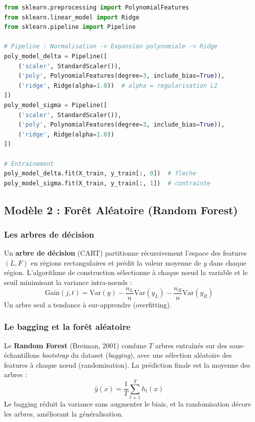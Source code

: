 \documentclass[journal, a4paper, twocolumn]{IEEEtran}
\begin{document}
\begin{lstlisting}[language=Python, caption=Pipeline Régression Polynomiale Ridge avec scikit-learn]
from sklearn.preprocessing import PolynomialFeatures
from sklearn.linear_model import Ridge
from sklearn.pipeline import Pipeline

# Pipeline : Normalisation -> Expansion polynomiale -> Ridge
poly_model_delta = Pipeline([
    ('scaler', StandardScaler()),
    ('poly', PolynomialFeatures(degree=3, include_bias=True)),
    ('ridge', Ridge(alpha=1.0))  # alpha = regularisation L2
])
poly_model_sigma = Pipeline([
    ('scaler', StandardScaler()),
    ('poly', PolynomialFeatures(degree=3, include_bias=True)),
    ('ridge', Ridge(alpha=1.0))
])

# Entrainement
poly_model_delta.fit(X_train, y_train[:, 0])  # fleche
poly_model_sigma.fit(X_train, y_train[:, 1])  # contrainte
\end{lstlisting}

\subsection{Modèle 2 : Forêt Aléatoire (Random Forest)}

\subsubsection{Les arbres de décision}

Un \textbf{arbre de décision} (CART) partitionne récursivement l'espace des features $(L, F)$ en régions rectangulaires et prédit la valeur moyenne de $y$ dans chaque région. L'algorithme de construction sélectionne à chaque nœud la variable et le seuil minimisant la variance intra-nœuds :
\begin{equation}
    \text{Gain}(j, t) = \text{Var}(y) - \frac{n_L}{n}\text{Var}(y_L) - \frac{n_R}{n}\text{Var}(y_R)
\end{equation}
Un arbre seul a tendance à sur-apprendre (overfitting).

\subsubsection{Le bagging et la forêt aléatoire}

Le \textbf{Random Forest} (Breiman, 2001) combine $T$ arbres entraînés sur des sous-échantillons \textit{bootstrap} du dataset (\textit{bagging}), avec une sélection aléatoire des features à chaque nœud (randomisation). La prédiction finale est la moyenne des arbres :
\begin{equation}
    \hat{y}(x) = \frac{1}{T}\sum_{t=1}^{T} h_t(x)
\end{equation}
Le bagging réduit la variance sans augmenter le biais, et la randomisation décore les arbres, améliorant la généralisation.
\end{document}
